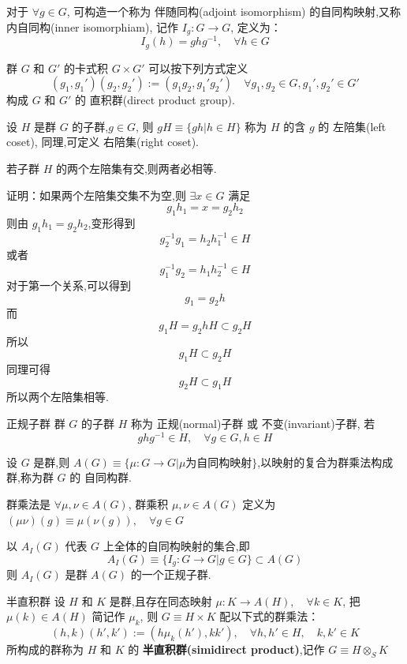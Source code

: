 \documentclass[../main.tex]{subfiles}
\begin{document}
对于 $\forall g\in G$, 可构造一个称为 伴随同构(adjoint isomorphism) 的自同构映射,又称 内自同构(inner isomorphiam), 记作 $I_g : G \rightarrow G$, 定义为：
     $$
     I_g(h) = ghg^{-1},\quad \forall h \in G
     $$
 \begin{definition}{}{}
 群 $G$ 和 $G'$ 的卡式积 $G\times G'$ 可以按下列方式定义
     $$
     (g_1, g_1') (g_2, g_2') :=(g_1g_2, g_1'g_2')\quad\forall g_1, g_2\in G, g_1', g_2'\in G' 
     $$
 构成 $G$ 和 $G'$ 的 直积群(direct product group).
 \end{definition}
 \begin{definition}
     设 $H$ 是群 $G$ 的子群,$g\in G$, 则 $gH \equiv \{gh|h\in H\}$ 称为 $H$ 的含 $g$ 的 左陪集(left coset), 同理,可定义 右陪集(right coset).
 \end{definition}
 \begin{note}
     若子群 $H$ 的两个左陪集有交,则两者必相等.
 \end{note}
    \noindent
     证明：如果两个左陪集交集不为空,则 $\exists x \in G$ 满足
    $$
     g_1h_1 = x = g_2h_2
     $$
     则由 $g_1h_1 =g_2h_2$,变形得到
     $$
     g_2^{-1} g_1 = h_2h_1^{-1} \in H
     $$
     或者
     $$
     g_1^{-1}g_2 = h_1h_2^{-1} \in H
     $$
     对于第一个关系,可以得到
     $$
     g_1 = g_2h
     $$
     而 
     $$
     g_1H = g_2hH \subset g_2H
     $$
     所以 
     $$
     g_1H\subset g_2H
     $$
     同理可得
     $$
     g_2H \subset g_1H
     $$
      所以两个左陪集相等.
\begin{definition}{}{正规子群}
	群 $G$ 的子群 $H$ 称为 正规(normal)子群 或 不变(invariant)子群, 若
	$$
		ghg^{-1} \in H,\quad \forall g \in G, h\in H
	$$
\end{definition}
 \begin{definition}
      设 $G$ 是群,则 $A(G)\equiv \{\mu:G\rightarrow G|\mu\text{为自同构映射}\}$,以映射的复合为群乘法构成群,称为群 $G$ 的 自同构群.

     群乘法是 $\forall \mu,\nu \in A(G)$, 群乘积 $\mu,\nu \in A(G)$ 定义为 $(\mu\nu)(g) \equiv \mu(\nu(g)),\quad \forall g \in G$
 \end{definition}
 \begin{theorem}
     以 $A_I(G)$ 代表 $G$ 上全体的自同构映射的集合,即
     $$
     A_I(G)\equiv\{I_g: G\rightarrow G|g \in G\}\subset A(G)
     $$
 则 $A_I(G)$ 是群 $A(G)$ 的一个正规子群.
 \end{theorem}
 \begin{definition}{}{半直积群}
 设 $H$ 和 $K$ 是群,且存在同态映射 $\mu:K\rightarrow A(H),\quad \forall k \in K$, 把 $\mu(k)\in A(H)$ 简记作 $\mu_k$, 则 $G\equiv H\times K$ 配以下式的群乘法：
     $$
     (h, k)(h', k'):=(h\mu_k(h'), kk'),\quad\forall h, h'\in H,\quad k, k' \in K
     $$
 所构成的群称为 $H$ 和 $K$ 的 \textbf{半直积群(simidirect product)},记作 $G\equiv H\otimes_{S}K$
 \end{definition}
\end{document}

